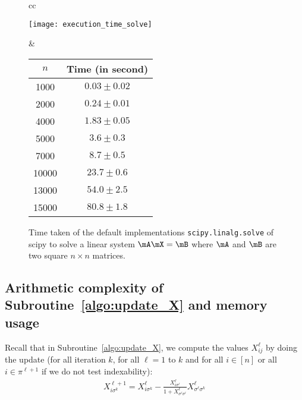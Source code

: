 \begin{subappendices}
\begin{figure}[ht]
    \centering
    \begin{tabular}{cc}
        \begin{minipage}{0.5\linewidth}
            \texttt{[image: execution\_time\_solve]}
        \end{minipage}
        &\begin{minipage}{0.45\linewidth}
            \begin{tabular}{|c|c|}
                \hline
                $n$ & Time (in second)\\\hline
                1000 & $ 0.03\pm0.02$ \\
                2000 & $ 0.24\pm0.01$ \\
                4000 & $ 1.83\pm0.05$ \\
                5000 & $ 3.6\pm0.3$ \\
                7000 & $ 8.7\pm0.5$ \\
                10000 & $23.7\pm0.6$ \\
                13000 & $54.0\pm2.5$ \\
                15000 & $80.8\pm1.8$ \\                
                \hline
            \end{tabular}
        \end{minipage}
    \end{tabular}
    \caption{Time taken of the default implementations \texttt{scipy.linalg.solve} of scipy to solve a linear system $\mA\mX=\mB$ where $\mA$ and $\mB$ are two square $n\times n$ matrices.}
    \label{fig:benchmark_inverse}
\end{figure}

\subsection{Arithmetic complexity of Subroutine~\ref{algo:update_X} and memory usage}

Recall that in Subroutine~\ref{algo:update_X}, we compute the values $X^{\ell}_{ij}$ by doing the update (for all iteration $k$, for all $\ell=1$ to $k$ and for all $i\in[n]$ or all $i\in\pi^{\ell+1}$ if we do not test indexability):
\begin{align}
    \label{eq:apx_update}
    X_{i\sigma^{k}}^{\ell+1} = X_{i\sigma^{k}}^{\ell} -\displaystyle\frac{X^{\ell}_{i\sigma^{\ell}}}{1+X^{\ell}_{\sigma^{\ell}\sigma^{\ell}}}X^{\ell}_{\sigma^{\ell}\sigma^{k}}
\end{align}


\end{subappendices}
